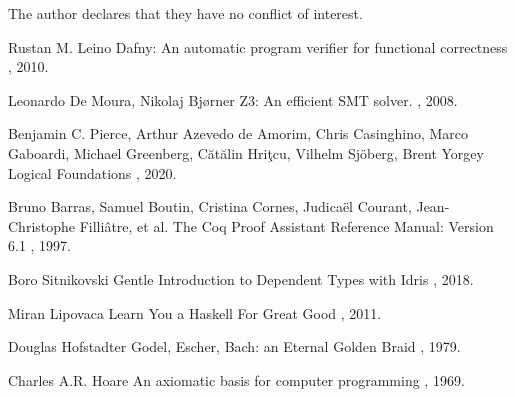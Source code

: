 \documentclass{article}
\begin{document}
The author declares that they have no conflict of interest.

\begin{thebibliography}{1}

Rustan M. Leino
\newblock Dafny: An automatic program verifier for functional correctness
, 2010.

Leonardo De Moura, Nikolaj Bjørner
\newblock Z3: An efficient SMT solver.
, 2008.

Benjamin C. Pierce, Arthur Azevedo de Amorim, Chris Casinghino, Marco Gaboardi, Michael Greenberg, Cătălin Hriţcu, Vilhelm Sjöberg, Brent Yorgey
\newblock Logical Foundations
, 2020.

Bruno Barras, Samuel Boutin, Cristina Cornes, Judicaël Courant, Jean-Christophe Filliâtre, et al.
\newblock The Coq Proof Assistant Reference Manual: Version 6.1
, 1997.

Boro Sitnikovski
\newblock Gentle Introduction to Dependent Types with Idris
, 2018.

Miran Lipovaca
\newblock Learn You a Haskell For Great Good
, 2011.

Douglas Hofstadter
\newblock Godel, Escher, Bach: an Eternal Golden Braid
, 1979.

Charles A.R. Hoare
\newblock An axiomatic basis for computer programming
, 1969.

\end{thebibliography}
\end{document}
